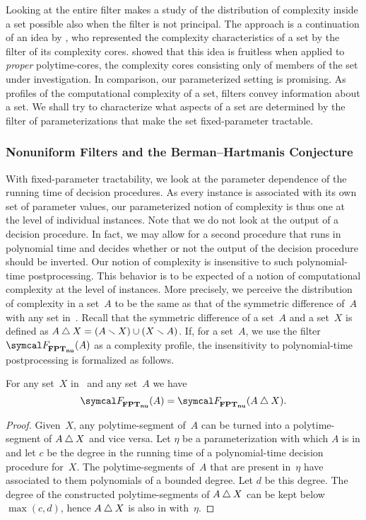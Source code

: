 Looking at the entire filter makes a study of the distribution of complexity inside a set possible also when the filter is not principal.
The approach is a continuation of an idea by \textcite{orponen1986classification}, who represented the complexity characteristics of a set by the filter of its complexity cores.
 showed that this idea is fruitless when applied to \emph{proper} polytime-cores, the complexity cores consisting only of members of the set under investigation.
In comparison, our parameterized setting is promising.
As profiles of the computational complexity of a set, filters convey information about a set.
We shall try to characterize what aspects of a set are determined by the filter of parameterizations that make the set fixed-parameter tractable.

\subsubsection{Nonuniform Filters and the Berman--Hartmanis Conjecture}
With fixed-parameter tractability, we look at the parameter dependence of the running time of decision procedures.
As every instance is associated with its own set of parameter values, our parameterized notion of complexity is thus one at the level of individual instances.
Note that we do not look at the output of a decision procedure.
In fact, we may allow for a second procedure that runs in polynomial time and decides whether or not the output of the decision procedure should be inverted.
Our notion of complexity is insensitive to such polynomial-time postprocessing.
This behavior is to be expected of a notion of computational complexity at the level of instances.
More precisely, we perceive the distribution of complexity in a set~$A$ to be the same as that of the symmetric difference of~$A$ with any set in~.
Recall that the symmetric difference of a set~$A$ and a set~$X$ is defined as $A \bigtriangleup X = (A \smallsetminus X) \cup (X \smallsetminus A)$.
If, for a set~$A$, we use the filter~$\calF_\clnu{FPT}(A)$ as a complexity profile, the insensitivity to polynomial-time postprocessing is formalized as follows.
\begin{theorem}
\label{thm:nufptsymdiffeq}%
  For any set~$X$ in~ and any set~$A$ we have
  \begin{equation*}
    \calF_\clnu{FPT}(A) = \calF_\clnu{FPT}(A \symdiff X).
  \end{equation*}
\end{theorem}
\begin{proof}
  Given~$X$, any polytime-segment of~$A$ can be turned into a polytime-segment of $A \bigtriangleup X$ and vice versa.
  Let $\eta$ be a parameterization with which $A$ is in  and let $c$ be the degree in the running time of a polynomial-time decision procedure for~$X$.
  The polytime-segments of~$A$ that are present in~$\eta$ have associated to them polynomials of a bounded degree.
  Let $d$ be this degree.
  The degree of the constructed polytime-segments of $A \bigtriangleup X$ can be kept below $\max(c, d)$, hence $A \bigtriangleup X$ is also in  with~$\eta$.
\end{proof}

